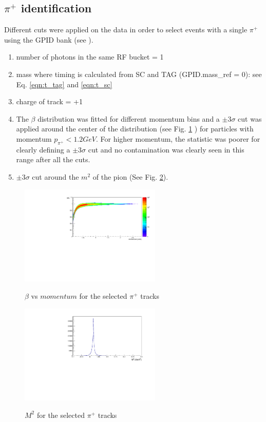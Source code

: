 \subsection{\texorpdfstring{$\pi^+$}{pi+} identification}
Different cuts were applied on the data in order to select events with a single $\pi^+$ using the GPID bank (see \cite{Pasyuk_gpid}).
\begin{enumerate}
  \item number of photons in the same RF bucket = 1 
  \item mass where timing is calculated from SC and TAG (GPID.mass\_ref = 0): see Eq. \ref{eqn:t_tag} and \ref{eqn:t_sc}
  \item charge of track = +1
  \item The $\beta$ distribution was fitted for different momentum bins and a $\pm 3 \sigma$ cut was applied around the center of the distribution (see Fig. \ref{fig:beta_mom_pip} ) for particles with momentum $p_{\pi^+} < 1.2GeV$. For higher momentum, the statistic was poorer for clearly defining a $\pm 3 \sigma$ cut and no contamination was clearly seen in this range after all the cuts.
  \item  $\pm 3 \sigma$ cut around the $m^2$ of the pion (See Fig. \ref{fig:mass2_pip}).
\end{enumerate}
\begin{figure}[!htb]
  \begin{center}
    \includegraphics[width=0.6\textwidth]{figures/pid_beta_mom_pip.pdf} \\
    \caption{$\beta$ vs $momentum$ for the selected $\pi^+$ tracks}
    \label{fig:beta_mom_pip}
  \end{center}
\end{figure}
\begin{figure}[!htb]
  \begin{center}
    \includegraphics[width=0.6\textwidth]{figures/pid_mass2_pip.pdf} \\
    \caption{$M^2$ for the selected $\pi^+$ tracks}
    \label{fig:mass2_pip}
  \end{center}
\end{figure}

